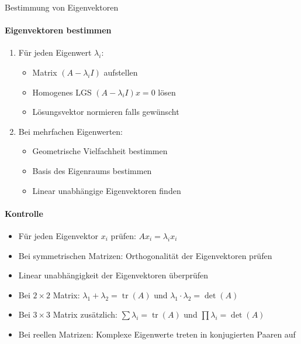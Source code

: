 \begin{KR}{Bestimmung von Eigenvektoren}

\paragraph{Eigenvektoren bestimmen}
\begin{enumerate}
    \item Für jeden Eigenwert $\lambda_i$:
    \begin{itemize}
        \item Matrix $(A - \lambda_i I)$ aufstellen
        \item Homogenes LGS $(A - \lambda_i I)x = 0$ lösen
        \item Lösungsvektor normieren falls gewünscht
    \end{itemize}

    \item Bei mehrfachen Eigenwerten:
    \begin{itemize}
        \item Geometrische Vielfachheit bestimmen
        \item Basis des Eigenraums bestimmen
        \item Linear unabhängige Eigenvektoren finden
    \end{itemize}
\end{enumerate}

\paragraph{Kontrolle}
\begin{itemize}
    \item Für jeden Eigenvektor $x_i$ prüfen: $Ax_i = \lambda_i x_i$
    \item Bei symmetrischen Matrizen: Orthogonalität der Eigenvektoren prüfen
    \item Linear unabhängigkeit der Eigenvektoren überprüfen
    \item Bei $2 \times 2$ Matrix: $\lambda_1 + \lambda_2 = \operatorname{tr}(A)$ und $\lambda_1 \cdot \lambda_2 = \det(A)$
    \item Bei $3 \times 3$ Matrix zusätzlich: $\sum \lambda_i = \operatorname{tr}(A)$ und $\prod \lambda_i = \det(A)$
    \item Bei reellen Matrizen: Komplexe Eigenwerte treten in konjugierten Paaren auf
\end{itemize}


\end{KR}
